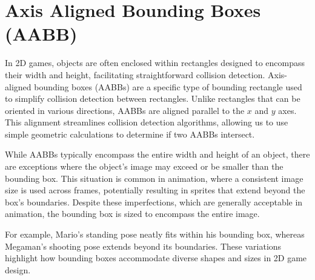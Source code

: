 \section{Axis Aligned Bounding Boxes (AABB)}
In 2D games, objects are often enclosed within rectangles designed to encompass
their width and height, facilitating straightforward collision detection.
Axis-aligned bounding boxes (AABBs) are a specific type of bounding rectangle
used to simplify collision detection between rectangles. Unlike rectangles that
can be oriented in various directions, AABBs are aligned parallel to the $x$
and $y$ axes. This alignment streamlines collision detection algorithms,
allowing us to use simple geometric calculations to determine if two AABBs
intersect.

While AABBs typically encompass the entire width and height of an object, there
are exceptions where the object's image may exceed or be smaller than the
bounding box. This situation is common in animation, where a consistent image
size is used across frames, potentially resulting in sprites that extend beyond
the box's boundaries. Despite these imperfections, which are generally
acceptable in animation, the bounding box is sized to encompass the entire
image.

For example, Mario's standing pose neatly fits within his bounding box, whereas
Megaman's shooting pose extends beyond its boundaries. These variations
highlight how bounding boxes accommodate diverse shapes and sizes in 2D game
design.

